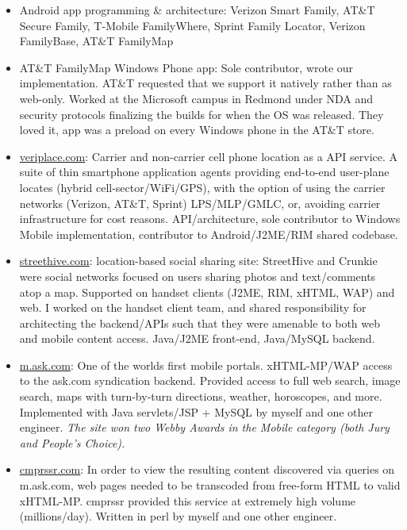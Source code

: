 	   \begin{itemize}
		\item Android app programming \& architecture: 
		Verizon Smart Family,
		AT\&T Secure Family, 
		T-Mobile FamilyWhere,
		Sprint Family Locator,
		Verizon FamilyBase,
		AT\&T FamilyMap   \\[-16pt]
		\item AT\&T FamilyMap Windows Phone app: Sole contributor, wrote our 
			implementation. AT\&T requested that we support it natively rather than as web-only. 
			Worked at the Microsoft campus in Redmond under NDA and security protocols
			finalizing the builds for when the OS was released.
			They loved it, app was a preload on every Windows phone in the AT\&T store. \\[-16pt]

		\item \url{veriplace.com}: Carrier and non-carrier cell phone location as a API service. 
		A suite of thin smartphone application agents providing
		end-to-end user-plane locates (hybrid cell-sector/WiFi/GPS), with the option of using the 
		carrier networks (Verizon, AT\&T, Sprint) LPS/MLP/GMLC, or, avoiding carrier infrastructure for cost reasons.
		API/architecture, sole contributor to Windows Mobile implementation, contributor to Android/J2ME/RIM
		shared codebase.

		\item \url{streethive.com}: location-based social sharing site: StreetHive and Crunkie were social networks 
		focused on users sharing photos and text/comments atop a map. Supported on 
		handset clients (J2ME, RIM, xHTML, WAP) and web.  
		I worked on the handset client team, and shared responsibility for architecting the backend/APIs such that
		they were amenable to both web and 
		mobile content access. Java/J2ME front-end, Java/MySQL backend.

		\item \url{m.ask.com}: One of the worlds first mobile portals.  xHTML-MP/WAP access to the ask.com
		syndication backend. Provided access to full web search, 
		image search, maps with turn-by-turn directions, weather, horoscopes, and more. 
		Implemented with Java servlets/JSP + MySQL 
		by myself and one other engineer.  {\em The site won two Webby Awards in the Mobile category 
		(both Jury and People's Choice).}

		\item \url{cmprssr.com}: In order to view the resulting content discovered via queries on m.ask.com, web 
		pages needed to be transcoded from free-form HTML to valid xHTML-MP. cmprssr provided this service at
		extremely high volume (millions/day). Written in perl by myself and one other engineer.


\end{itemize}
